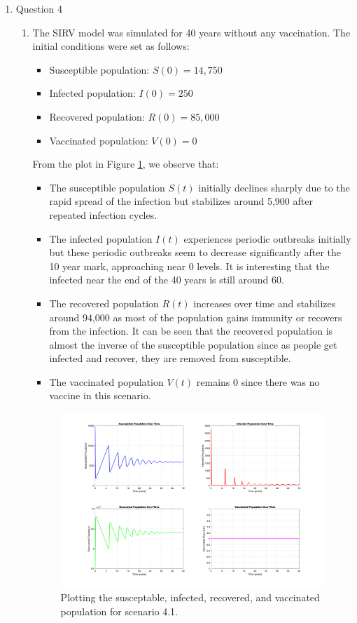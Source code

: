 \documentclass[12pt]{article}
\begin{document}
\begin{enumerate}
\item Question 4
  \begin{enumerate}
  \item The SIRV model was simulated for 40 years without any vaccination. The initial conditions were set as follows: 
  \begin{itemize}
      \item Susceptible population: \( S(0) = 14,750 \)
      \item Infected population: \( I(0) = 250 \)
      \item Recovered population: \( R(0) = 85,000 \)
      \item Vaccinated population: \( V(0) = 0 \)
  \end{itemize}

  From the plot in Figure \ref{fig:figure41}, we observe that:
  \begin{itemize}
      \item The susceptible population \( S(t) \) initially declines sharply due to the rapid spread of the infection but stabilizes around 5,900 after repeated infection cycles.
      \item The infected population \( I(t) \) experiences periodic outbreaks initially but these periodic outbreaks seem to decrease significantly after the 10 year mark, approaching near 0 levels. It is interesting that the infected near the end of the 40 years is still around 60.
      \item The recovered population \( R(t) \) increases over time and stabilizes around 94,000 as most of the population gains immunity or recovers from the infection. It can be seen that the recovered population is almost the inverse of the susceptible population since as people get infected and recover, they are removed from susceptible.
      \item The vaccinated population \( V(t) \) remains 0 since there was no vaccine in this scenario.
  \end{itemize}

  \begin{figure}[H]
    \centering
    \includegraphics[width=\textwidth]{Figures/figure41.png}
    \caption{Plotting the susceptable, infected, recovered, and vaccinated population for scenario 4.1.}
    \label{fig:figure41}
  \end{figure}


\end{enumerate}
\end{enumerate}
\end{document}
